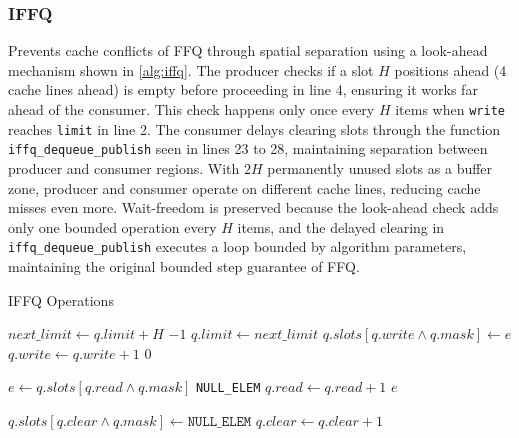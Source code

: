 \subsubsection{\acf{IFFQ}}
Prevents cache conflicts of \ac{FFQ} through spatial separation using a look-ahead mechanism shown in \cref{alg:iffq}. The producer checks if a slot $H$ positions ahead (4 cache lines ahead) is empty before proceeding in line 4, ensuring it works far ahead of the consumer. This check happens only once every $H$ items when \texttt{write} reaches \texttt{limit} in line 2. The consumer delays clearing slots through the function \texttt{iffq\_dequeue\_publish} seen in lines 23 to 28, maintaining separation between producer and consumer regions. With $2H$ permanently unused slots as a buffer zone, producer and consumer operate on different cache lines, reducing cache misses even more. Wait-freedom is preserved because the look-ahead check adds only one bounded operation every $H$ items, and the delayed clearing in \texttt{iffq\_dequeue\_publish} executes a loop bounded by algorithm parameters, maintaining the original bounded step guarantee of \ac{FFQ}.\cite{MaffioneCacheAware}

\begin{algorithm}[!ht]
    \centering
    \captionsetup{justification=centering}
    \caption{\ac{IFFQ} Operations \cite{MaffioneCacheAware}}
    \label{alg:iffq}
    \scriptsize
    \begin{algorithmic}[1]
             
                \State $next\_limit \gets q.limit + H$
                    \State \Return $-1$ 
                \EndIf
                \State $q.limit \gets next\_limit$ 
            \EndIf
            \State $q.slots[q.write \land q.mask] \gets e$
            \State $q.write \gets q.write + 1$
            \State \Return $0$
        \EndFunction
        
        \State
        
            \State $e \gets q.slots[q.read \land q.mask]$
                \State \Return \texttt{NULL\_ELEM}
            \EndIf
            \State $q.read \gets q.read + 1$
            \State \Return $e$
        \EndFunction
        
        \State
        
                \State $q.slots[q.clear \land q.mask] \gets \texttt{NULL\_ELEM}$
                \State $q.clear \gets q.clear + 1$
            \EndWhile
        \EndFunction
    \end{algorithmic}
\end{algorithm}

